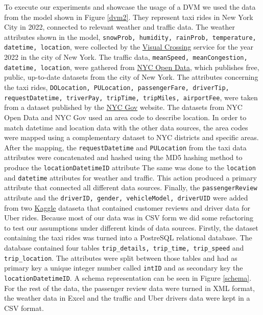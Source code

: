 To execute our experiments and showcase the usage of a DVM we used the data from the model shown in Figure \ref{dvm2}. They represent taxi rides in New York City in 2022, connected to relevant weather and traffic data. The weather attributes shown in the model, \texttt{snowProb, humidity, rainProb, temperature, datetime, location},  were collected by the \href{https://www.visualcrossing.com/}{Visual Crossing} service for the year 2022 in the city of New York. The traffic data, \texttt{meanSpeed, meanCongestion, datetime, location}, were gathered from \href{https://opendata.cityofnewyork.us/}{NYC Open Data}, which publishes free, public, up-to-date datasets from the city of New York. The attributes concerning the taxi rides, \texttt{DOLocation, PULocation, passengerFare, driverTip, requestDatetime, triverPay, tripTime, tripMiles, airportFee}, were taken from a dataset published by the \href{https://www.nyc.gov/site/tlc/about/tlc-trip-record-data.page}{NYC Gov} website. The datasets from NYC Open Data and NYC Gov used an area code to describe location. In order to match datetime and location data with the other data sources, the area codes were mapped using a complementary dataset to NYC districts and specific areas. After the mapping, the \texttt{requestDatetime} and \texttt{PULocation} from the taxi data attributes were concatenated and hashed using the MD5 hashing method to produce the \texttt{locationDatetimeID} attribute The same was done to the \texttt{location} and \texttt{datetime} attributes for weather and traffic. This action produced a primary attribute that connected all different data sources. Finally, the \texttt{passengerReview} attribute and the \texttt{driverID, gender, vehicleModel, driverUID} were added from two \href{https://www.kaggle.com/}{Kaggle} dataseta that contained customer reviews and driver data for Uber rides. Because most of our data was in CSV form we did some refactoring to test our assumptions under different kinds of data sources. Firstly, the dataset containing the taxi rides was turned into a PostreSQL relational database. The database contained four tables \texttt{trip\_details, trip\_time, trip\_speed} and \texttt{trip\_location}. The attributes were split between those tables and had as primary key a unique integer number called \texttt{intID} and as secondary key the \texttt{locationDatetimeID}. A schema representation can be seen in Figure \ref{schema}. For the rest of the data, the passenger review data were turned in XML format, the weather data in Excel and the traffic and Uber drivers data were kept in a CSV format.

